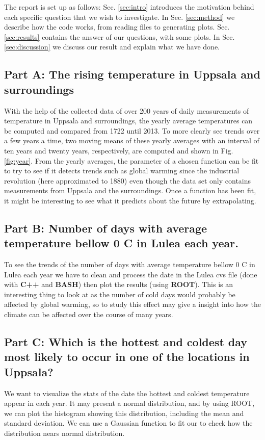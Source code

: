 \documentclass[a4paper]{article}
\begin{document}
The report is set up as follows: Sec. \ref{sec:intro} introduces the motivation behind each specific question that we wish to investigate. In Sec. \ref{sec:method}  we describe how the code works, from reading files to generating plots. Sec. \ref{sec:results} contains the answer of our questions, with some plots. In Sec. \ref{sec:discussion} we discuss our result and explain what we have done.

\subsection{Part A: The rising temperature in Uppsala and surroundings}
With the help of the collected data of over 200 years of daily measurements of temperature in Uppsala and surroundings, the yearly average temperatures can be computed and compared from 1722 until 2013. To more clearly see trends over a few years a time, two moving means of these yearly averages with an interval of ten years and twenty years, respectively, are computed and shown in Fig.\ref{fig:year}.  From the yearly averages, the parameter of a chosen function can be fit to try to see if it detects trends such as global warming since the industrial revolution (here approximated to 1880) even though the data set only contains measurements from Uppsala and the surroundings. Once a function has been fit, it might be interesting to see what it predicts about the future by extrapolating.
\subsection{Part B: Number of days with average temperature bellow 0 C \degree in Lulea each year.} 
To see the trends of the number of days with average temperature bellow 0 C \degree in Lulea each year we have to clean and process the date in the Lulea cvs file (done with \textbf{C++} and \textbf{BASH}) then plot the results (using \textbf{ROOT}). This is an interesting thing to look at as the number of cold days would probably be affected by global warming, so to study this effect may give a insight into how the climate can be affected over the course of many years.

\subsection{Part C: Which is the hottest and coldest day most likely to occur in one of the locations in Uppsala?}
We want to visualize the stats of the date the hottest and coldest temperature appear in each year. It may present a normal distribution, and by using ROOT, we can plot the histogram showing this distribution, including the mean and standard deviation. We can use a Gaussian function to fit our to check how the distribution nears normal distribution. 
\end{document}
